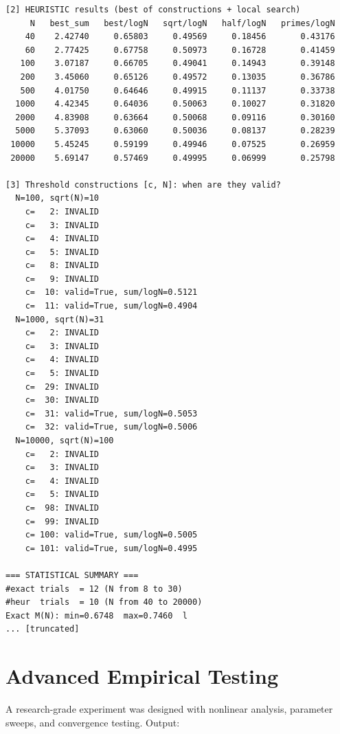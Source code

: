 \documentclass[11pt]{article}
\begin{document}
\begin{lstlisting}
[2] HEURISTIC results (best of constructions + local search)
     N   best_sum   best/logN   sqrt/logN   half/logN   primes/logN
    40    2.42740     0.65803     0.49569     0.18456       0.43176
    60    2.77425     0.67758     0.50973     0.16728       0.41459
   100    3.07187     0.66705     0.49041     0.14943       0.39148
   200    3.45060     0.65126     0.49572     0.13035       0.36786
   500    4.01750     0.64646     0.49915     0.11137       0.33738
  1000    4.42345     0.64036     0.50063     0.10027       0.31820
  2000    4.83908     0.63664     0.50068     0.09116       0.30160
  5000    5.37093     0.63060     0.50036     0.08137       0.28239
 10000    5.45245     0.59199     0.49946     0.07525       0.26959
 20000    5.69147     0.57469     0.49995     0.06999       0.25798

[3] Threshold constructions [c, N]: when are they valid?
  N=100, sqrt(N)=10
    c=   2: INVALID
    c=   3: INVALID
    c=   4: INVALID
    c=   5: INVALID
    c=   8: INVALID
    c=   9: INVALID
    c=  10: valid=True, sum/logN=0.5121
    c=  11: valid=True, sum/logN=0.4904
  N=1000, sqrt(N)=31
    c=   2: INVALID
    c=   3: INVALID
    c=   4: INVALID
    c=   5: INVALID
    c=  29: INVALID
    c=  30: INVALID
    c=  31: valid=True, sum/logN=0.5053
    c=  32: valid=True, sum/logN=0.5006
  N=10000, sqrt(N)=100
    c=   2: INVALID
    c=   3: INVALID
    c=   4: INVALID
    c=   5: INVALID
    c=  98: INVALID
    c=  99: INVALID
    c= 100: valid=True, sum/logN=0.5005
    c= 101: valid=True, sum/logN=0.4995

=== STATISTICAL SUMMARY ===
#exact trials  = 12 (N from 8 to 30)
#heur  trials  = 10 (N from 40 to 20000)
Exact M(N): min=0.6748  max=0.7460  l
... [truncated]
\end{lstlisting}


\section{Advanced Empirical Testing}

A research-grade experiment was designed with nonlinear analysis, parameter sweeps,
and convergence testing. Output:
\end{document}
